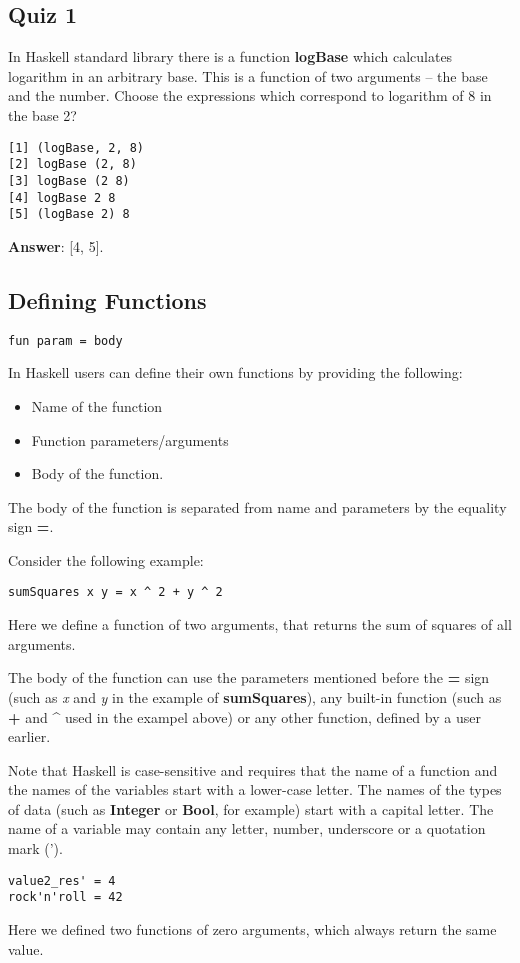 \documentclass[11pt]{article}
\begin{document}
\subsection{Quiz 1}
\label{sec:orgb756769}
In Haskell standard library there is a function \textbf{logBase} which
calculates logarithm in an arbitrary base. This is a function of two
arguments -- the base and the number.
Choose the expressions which correspond to logarithm of 8 in the base
2?
\begin{verbatim}
[1] (logBase, 2, 8)
[2] logBase (2, 8)
[3] logBase (2 8)
[4] logBase 2 8
[5] (logBase 2) 8
\end{verbatim}
\textbf{Answer}: [4, 5].

\subsection{Defining Functions}
\label{sec:org5b55cce}
\begin{verbatim}
fun param = body
\end{verbatim}
In Haskell users can define their own functions by providing the
following:
\begin{itemize}
\item Name of the function
\item Function parameters/arguments
\item Body of the function.
\end{itemize}
The body of the function is separated from name and parameters by the
equality sign \textbf{=}.

Consider the following example:
\begin{verbatim}
sumSquares x y = x ^ 2 + y ^ 2
\end{verbatim}
Here we define a function of two arguments, that returns the sum of
squares of all arguments.

The body of the function can use the parameters mentioned before the
\textbf{=} sign (such as \emph{x} and \emph{y} in the example of \textbf{sumSquares}), any
built-in function (such as \textbf{+} and \textbf{\^{}} used in the exampel above) or
any other function, defined by a user earlier.

Note that Haskell is case-sensitive and requires that the name of a
function and the names of the variables start with a lower-case
letter. The names of the types of data (such as \textbf{Integer} or \textbf{Bool},
for example) start with a capital letter.
The name of a variable may contain any letter, number, underscore or a
quotation mark (').
\begin{verbatim}
value2_res' = 4
rock'n'roll = 42
\end{verbatim}
Here we defined two functions of zero arguments, which always return
the same value.
\end{document}
